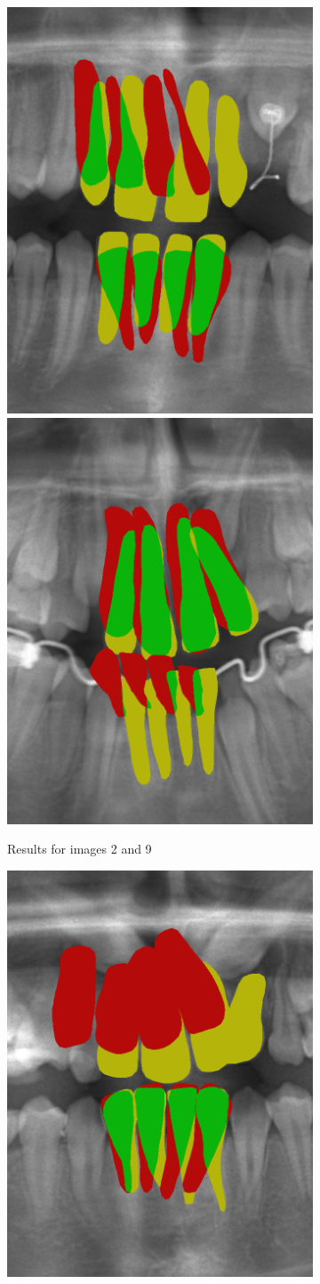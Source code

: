 \documentclass[a4paper,titlepage,12pt]{article}
\begin{document}
\begin{figure}
	\begin{subfigure}{0.48\linewidth}
		\centering
		\includegraphics[width=0.48\columnwidth]{results/2i50}
		\includegraphics[width=0.48\columnwidth]{results/9i50}
		\caption{Results for images 2 and 9}
	\end{subfigure}
	\begin{subfigure}{0.48\linewidth}
		\centering
		\includegraphics[width=0.48\columnwidth]{results/5i50}

\end{subfigure}
\end{figure}
\end{document}
